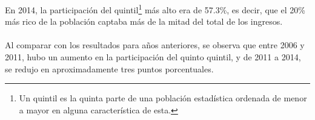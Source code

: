  En 2014, la participación del quintil\footnote{Un quintil es la quinta parte de una población estadística ordenada de menor a mayor en alguna característica de esta.} más alto era de 57.3\%, es decir, que el 20\% más rico de la población captaba más de la mitad del total de los ingresos. \\\\
Al comparar con los resultados para años anteriores, se observa que entre 2006 y 2011, hubo un aumento en la participación del quinto quintil, y de 2011 a 2014, se redujo en aproximadamente   tres puntos porcentuales.  